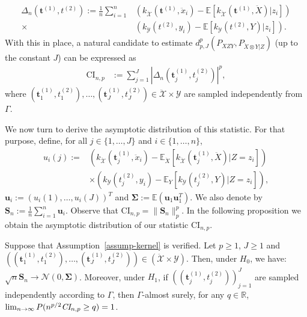 \begin{align*}
 \Delta_{n}(\mathbf{t}^{(1)},t^{(2)}):=\frac{1}{n}\sum_{i=1}^n & \left(k_{\mathcal{\ddot{X}}}(\mathbf{t}^{(1)},\ddot{x}_i)- \mathbb{E}\left[k_{\mathcal{\ddot{X}}}(\mathbf{t}^{(1)},\ddot{X})|z_i\right]\right)\\
\times&\left(k_{\mathcal{Y}}(t^{(2)},y_i)- \mathbb{E}\left[k_{\mathcal{Y}}(t^{(2)},Y)|z_i\right]\right).
\end{align*} 
With this in place, a natural candidate to estimate $d_{p,J}^p (P_{XZY},P_{\ddot{X}\otimes Y|Z})$ (up to the constant $J$) can be expressed as
\begin{align*}
\text{CI}_{n,p}&:=\sum_{j=1}^J \left|  \Delta_{n}(\mathbf{t}^{(1)}_j,t^{(2)}_j)\right|^p,
\end{align*}
where $(\mathbf{t}^{(1)}_1,t^{(2)}_1),\dots,(\mathbf{t}^{(1)}_J,t^{(2)}_J)\in\mathcal{\ddot{X}}\times\mathcal{Y}$ are sampled independently from $\Gamma$.

We now turn to derive the asymptotic distribution of this statistic. For that purpose, define, for all $j\in\{1,\dots,J\}$ and $i\in\{1,\dots,n\}$,
\begin{align*}
    u_i(j):=&\left(k_{\mathcal{\ddot{X}}}(\mathbf{t}^{(1)}_j,\ddot{x}_i)- \mathbb{E}_{\ddot{X}}\left[k_{\mathcal{\ddot{X}}}(\mathbf{t}^{(1)}_j,\ddot{X})|Z=z_i\right]\right) \\&\times\left(k_{\mathcal{Y}}(t^{(2)}_j,y_i)- \mathbb{E}_{Y}\left[k_{\mathcal{Y}}(t^{(2)}_j,Y)|Z=z_i\right]\right),
\end{align*}
$\mathbf{u}_i:=(u_i(1),\dots,u_i(J))^T$  and $\bm{\Sigma}:=\mathbb{E}(\mathbf{u}_1\mathbf{u}_1^T)$. We also denote by $\mathbf{S}_{n}:=\frac{1}{n}\sum_{i=1}^n \mathbf{u}_{i}$. Observe that $\text{CI}_{n,p}=\lVert\mathbf{S}_{n}\rVert_p^p$. In the following proposition we obtain the asymptotic distribution of our statistic $\text{CI}_{n,p}$.
\begin{prop}
\label{prop:oracle-law}
Suppose that Assumption~\ref{assump-kernel} is verified. Let $p\geq 1$, $J\geq 1$ and $((\mathbf{t}^{(1)}_1,t^{(2)}_1),\dots,(\mathbf{t}^{(1)}_J,t^{(2)}_J))\in(\mathcal{\ddot{X}}\times\mathcal{Y})$. Then, under $H_0$, we have: $\sqrt{n}\mathbf{S}_{n}\rightarrow \mathcal{N}(0,\bm{\Sigma})$. Moreover, under $H_1$, if $((\mathbf{t}^{(1)}_j,t^{(2)}_j))_{j=1}^J$ are sampled independently according to $\Gamma$, then $\Gamma$-almost surely, for any $q\in\mathbb{R}$, $\lim_{n\rightarrow\infty}P( n^{p/2}\emph{CI}_{n,p} \geq q)=1$.
\end{prop}


